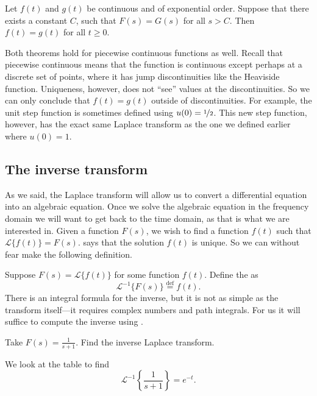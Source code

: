 \documentclass{ximera}
\begin{document}
\begin{theorem}[Uniqueness]
\label{lt:uniqthm}
Let $f(t)$ and $g(t)$ be continuous and of exponential order. Suppose that there exists a constant $C$, such that $F(s) = G(s)$ for all $s > C$. Then $f(t) = g(t)$ for all $t \geq 0$.
\end{theorem}

Both theorems hold for piecewise continuous functions as well. Recall that piecewise continuous means that the function is continuous except perhaps at a discrete set of points, where it has jump discontinuities like the Heaviside function.  Uniqueness, however, does not ``see'' values at the discontinuities.  So we can only conclude that $f(t) = g(t)$ outside of discontinuities.  For example, the unit step function is sometimes defined using $u(0) = \nicefrac{1}{2}$.  This new step function, however, has the exact same Laplace transform as the one we defined earlier where $u(0) = 1$.

\subsection{The inverse transform}

As we said, the Laplace transform will allow us to convert a differential equation into an algebraic equation.  Once we solve the algebraic equation in the frequency domain we will want to get back to the time domain, as that is what we are interested in. Given a function $F(s)$, we wish to find a function $f(t)$ such that $\mathcal{L} \bigl\{ f(t) \bigr\} = F(s)$.  says that the solution $f(t)$ is unique. So we can without fear make the following definition.

Suppose $F(s) = \mathcal{L} \bigl\{ f(t) \bigr\}$ for some function $f(t)$. Define the \emph{} as
\begin{equation*}
    {\mathcal{L}}^{-1} \bigl\{ F(s) \bigr\} \overset{\text{def}}{=} f(t) .
\end{equation*}
There is an integral formula for the inverse, but it is not as simple as the transform itself---it requires complex numbers and path integrals. For us it will suffice to compute the inverse using .

\begin{example}
    Take $F(s) = \frac{1}{s+1}$.  Find the inverse Laplace transform.
    
    We look at the table to find
    \begin{equation*}
        {\mathcal{L}}^{-1} \left\{ \frac{1}{s+1} \right\} = e^{-t} .
    \end{equation*}
\end{example}
\end{document}
